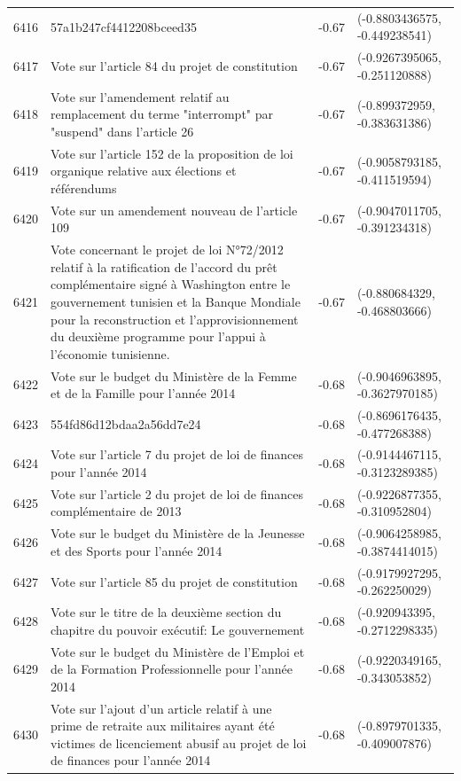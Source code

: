 \begin{table}[ht]
\begin{tabular}{rlrl}
  6416 & 57a1b247cf4412208bceed35 & -0.67 & (-0.8803436575, -0.449238541) \\ 
  6417 & Vote sur l'article 84 du projet de constitution & -0.67 & (-0.9267395065, -0.251120888) \\ 
  6418 & Vote sur l'amendement relatif au remplacement du terme "interrompt" par "suspend" dans l'article 26 & -0.67 & (-0.899372959, -0.383631386) \\ 
  6419 & Vote sur l'article 152 de la proposition de loi organique relative aux élections et référendums & -0.67 & (-0.9058793185, -0.411519594) \\ 
  6420 & Vote sur un amendement nouveau de l'article 109 & -0.67 & (-0.9047011705, -0.391234318) \\ 
  6421 & Vote concernant le projet de loi N°72/2012 relatif à la ratification de l'accord du prêt complémentaire signé à Washington entre le gouvernement tunisien et la Banque Mondiale pour la reconstruction et l'approvisionnement du deuxième programme pour l'appui à l'économie tunisienne. & -0.67 & (-0.880684329, -0.468803666) \\ 
  6422 & Vote sur le budget du Ministère de la Femme et de la Famille pour l'année 2014 & -0.68 & (-0.9046963895, -0.3627970185) \\ 
  6423 & 554fd86d12bdaa2a56dd7e24 & -0.68 & (-0.8696176435, -0.477268388) \\ 
  6424 & Vote sur l'article 7 du projet de loi de finances pour l'année 2014 & -0.68 & (-0.9144467115, -0.3123289385) \\ 
  6425 & Vote sur l'article 2 du projet de loi de finances complémentaire de 2013 & -0.68 & (-0.9226877355, -0.310952804) \\ 
  6426 & Vote sur le budget du Ministère de la Jeunesse et des Sports pour l'année 2014 & -0.68 & (-0.9064258985, -0.3874414015) \\ 
  6427 & Vote sur l'article 85 du projet de constitution & -0.68 & (-0.9179927295, -0.262250029) \\ 
  6428 & Vote sur le titre de la deuxième section du chapitre du pouvoir exécutif: Le gouvernement & -0.68 & (-0.920943395, -0.2712298335) \\ 
  6429 & Vote sur le budget du Ministère de l'Emploi et de la Formation Professionnelle pour l'année 2014 & -0.68 & (-0.9220349165, -0.343053852) \\ 
  6430 & Vote sur l'ajout d'un article relatif à une prime de retraite aux militaires ayant été victimes de licenciement abusif au projet de loi de finances pour l'année 2014 & -0.68 & (-0.8979701335, -0.409007876) \\ 

\end{tabular}
\end{table}

